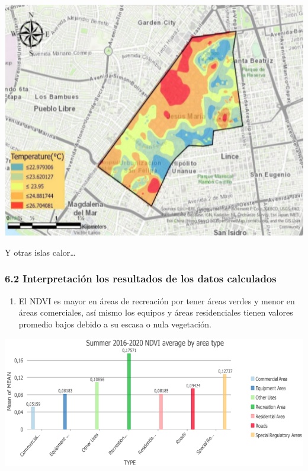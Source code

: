 \documentclass[
]{article}
\providecommand{\tightlist}{%
  \setlength{\itemsep}{0pt}\setlength{\parskip}{0pt}}
\begin{document}
\begin{center}\includegraphics[width=7.08in]{Img/Islas} \end{center}

Y otras islas calor\ldots{}

\hypertarget{interpretaciuxf3n-los-resultados-de-los-datos-calculados}{%
\subsubsection{6.2 Interpretación los resultados de los datos
calculados}\label{interpretaciuxf3n-los-resultados-de-los-datos-calculados}}

\begin{enumerate}
\def\labelenumi{\alph{enumi})}
\tightlist
\item
  El NDVI es mayor en áreas de recreación por tener áreas verdes y menor
  en áreas comerciales, así mismo los equipos y áreas residenciales
  tienen valores promedio bajos debido a su escasa o nula vegetación.
\end{enumerate}

\begin{center}\includegraphics[width=0.8\linewidth]{Img/interpretacionislas} \end{center}
\end{document}
